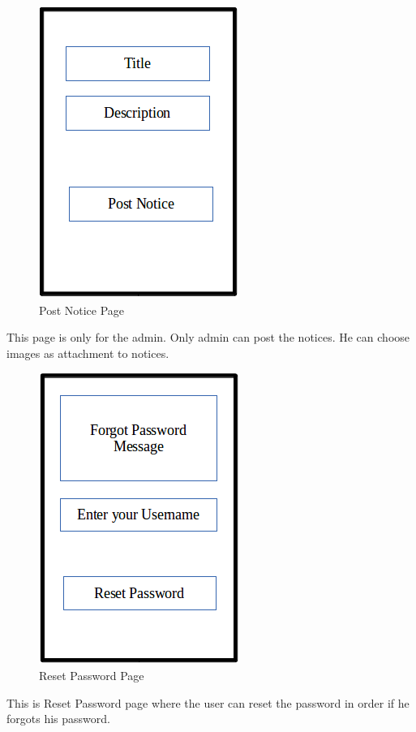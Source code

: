 \begin{figure}[H]
\centering \includegraphics[scale=0.5]{image/ui5.png}
\caption{Post Notice Page}
\end{figure}

This page is only for the admin. Only admin can post the notices. He can choose images as attachment to notices.

\begin{figure}[H]
\centering \includegraphics[scale=0.5]{image/ui6.png}
\caption{Reset Password Page}
\end{figure}

This is Reset Password page where the user can reset the password in order if he forgots his password.

\pagebreak
